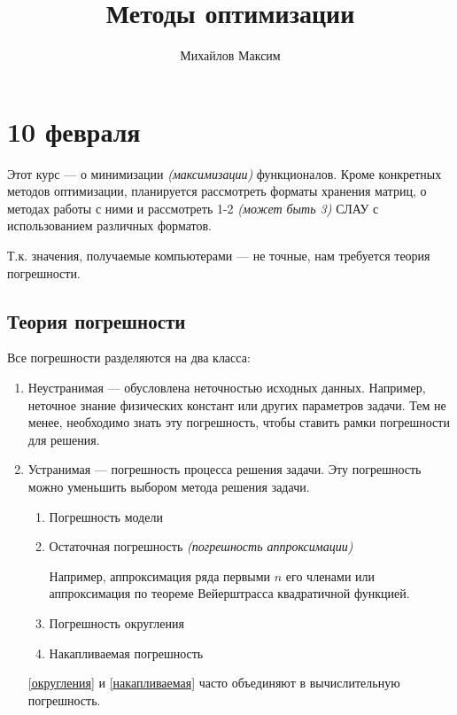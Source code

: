\documentclass[12pt, a4paper, oneside]{book}
\begin{document}
\title{Методы оптимизации}
\author{Михайлов Максим}

\maketitle

\tableofcontents

\chapter{10 февраля}

Этот курс --- о минимизации \textit{(максимизации)} функционалов. Кроме конкретных методов оптимизации, планируется рассмотреть форматы хранения матриц, о методах работы с ними и рассмотреть 1-2 \textit{(может быть 3)} СЛАУ с использованием различных форматов.

Т.к. значения, получаемые компьютерами --- не точные, нам требуется теория погрешности.

\section{Теория погрешности}

Все погрешности разделяются на два класса:

\begin{enumerate}
    \item Неустранимая --- обусловлена неточностью исходных данных. Например, неточное знание физических констант или других параметров задачи. Тем не менее, необходимо знать эту погрешность, чтобы ставить рамки погрешности для решения.
    \item Устранимая --- погрешность процесса решения задачи. Эту погрешность можно уменьшить выбором метода решения задачи.
          \begin{enumerate}
              \item Погрешность модели
              \item Остаточная погрешность \textit{(погрешность аппроксимации)}

                    Например, аппроксимация ряда первыми \(n\) его членами или аппроксимация по теореме Вейерштрасса квадратичной функцией.

              \item Погрешность округления \label{округления}
              \item Накапливаемая погрешность \label{накапливаемая}
          \end{enumerate}

          \ref{округления} и \ref{накапливаемая} часто объединяют в вычислительную погрешность.
\end{enumerate}
\end{document}
